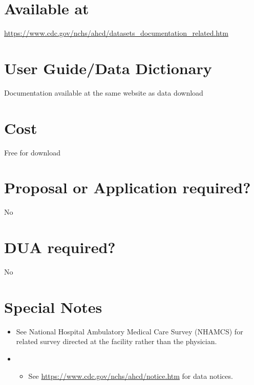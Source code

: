 \documentclass[
]{book}
\providecommand{\tightlist}{%
  \setlength{\itemsep}{0pt}\setlength{\parskip}{0pt}}
\begin{document}
\hypertarget{available-at-42}{%
\section{Available at}\label{available-at-42}}

\url{https://www.cdc.gov/nchs/ahcd/datasets_documentation_related.htm}

\hypertarget{user-guidedata-dictionary-42}{%
\section{User Guide/Data Dictionary}\label{user-guidedata-dictionary-42}}

Documentation available at the same website as data download

\hypertarget{cost-42}{%
\section{Cost}\label{cost-42}}

Free for download

\hypertarget{proposal-or-application-required-42}{%
\section{Proposal or Application required?}\label{proposal-or-application-required-42}}

No

\hypertarget{dua-required-42}{%
\section{DUA required?}\label{dua-required-42}}

No

\hypertarget{special-notes-42}{%
\section{Special Notes}\label{special-notes-42}}

\begin{itemize}
\item
  See National Hospital Ambulatory Medical Care Survey (NHAMCS) for related survey directed at the facility rather than the physician.
\item
  \begin{itemize}
  \tightlist
  \item
    See \url{https://www.cdc.gov/nchs/ahcd/notice.htm} for data notices.
  \end{itemize}
\end{itemize}
\end{document}
